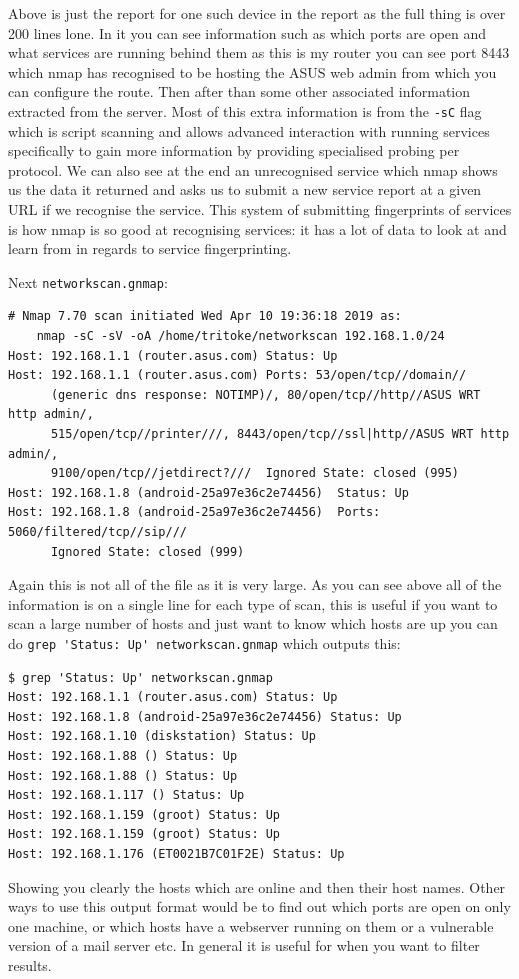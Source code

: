 \documentclass[titlepage]{article}
\begin{document}
Above is just the report for one such device in the report as the full thing is over 200 lines lone.
In it you can see information such as which ports are open and what services are running behind them
as this is my router you can see port 8443 which nmap has recognised to be hosting the ASUS web
admin from which you can configure the route. Then after than some other associated information
extracted from the server. Most of this extra information is from the \verb|-sC| flag which is
script scanning and allows advanced interaction with running services specifically to gain more
information by providing specialised probing per protocol. We can also see at the end an
unrecognised service which nmap shows us the data it returned and asks us to submit a new service
report at a given URL if we recognise the service. This system of submitting fingerprints of
services is how nmap is so good at recognising services: it has a lot of data to look at and learn
from in regards to service fingerprinting.

Next \verb|networkscan.gnmap|:
\begin{verbatim}
# Nmap 7.70 scan initiated Wed Apr 10 19:36:18 2019 as:
    nmap -sC -sV -oA /home/tritoke/networkscan 192.168.1.0/24
Host: 192.168.1.1 (router.asus.com) Status: Up
Host: 192.168.1.1 (router.asus.com) Ports: 53/open/tcp//domain//
      (generic dns response: NOTIMP)/, 80/open/tcp//http//ASUS WRT http admin/,
      515/open/tcp//printer///, 8443/open/tcp//ssl|http//ASUS WRT http admin/,
      9100/open/tcp//jetdirect?///  Ignored State: closed (995)
Host: 192.168.1.8 (android-25a97e36c2e74456)  Status: Up
Host: 192.168.1.8 (android-25a97e36c2e74456)  Ports: 5060/filtered/tcp//sip///
      Ignored State: closed (999)
\end{verbatim}
Again this is not all of the file as it is very large. As you can see above all of the information 
is on a single line for each type of scan, this is useful if you want to scan a large number of 
hosts and just want to know which hosts are up you can do \verb|grep 'Status: Up' networkscan.gnmap|
which outputs this:
\begin{verbatim}
$ grep 'Status: Up' networkscan.gnmap
Host: 192.168.1.1 (router.asus.com) Status: Up
Host: 192.168.1.8 (android-25a97e36c2e74456) Status: Up
Host: 192.168.1.10 (diskstation) Status: Up
Host: 192.168.1.88 () Status: Up
Host: 192.168.1.88 () Status: Up
Host: 192.168.1.117 () Status: Up
Host: 192.168.1.159 (groot) Status: Up
Host: 192.168.1.159 (groot) Status: Up
Host: 192.168.1.176 (ET0021B7C01F2E) Status: Up
\end{verbatim}
Showing you clearly the hosts which are online and then their host names. Other ways to use this
output format would be to find out which ports are open on only one machine, or which hosts have a
webserver running on them or a vulnerable version of a mail server etc. In general it is useful for
when you want to filter results.
\end{document}
